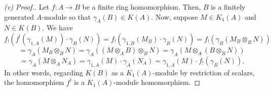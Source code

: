 \begin{proof}[(v) Proof.]
Let $f : A \to B$ be a finite ring homomorphism. Then, $B$ is a finitely generated $A$-module so that $\gamma_A(B) \in K(A)$. Now, suppose $M \in K_1(A)$ and $N \in K(B)$.
We have
$$f_!(f^!(\gamma_{1,A}(M)) \cdot \gamma_B(N)) = f_!(\gamma_{1,B}(M_B) \cdot \gamma_B(N)) = f_!(\gamma_B(M_B \otimes_B N))$$
$$= \gamma_A(M_B \otimes_B N) = \gamma_A((M \otimes_A B) \otimes_B N) = \gamma_A(M \otimes_A (B \otimes_B N))$$
$$= \gamma_A(M \otimes_A N_A) = \gamma_{1,A}(M) \cdot \gamma_A(N_A) = \gamma_{1,A}(M) \cdot f_!(\gamma_B(N)).$$
In other words, regarding $K(B)$ as a $K_1(A)$-module by restriction of scalars, the homomorphism $f^!$ is a $K_1(A)$-module homomorphism.
\end{proof}

